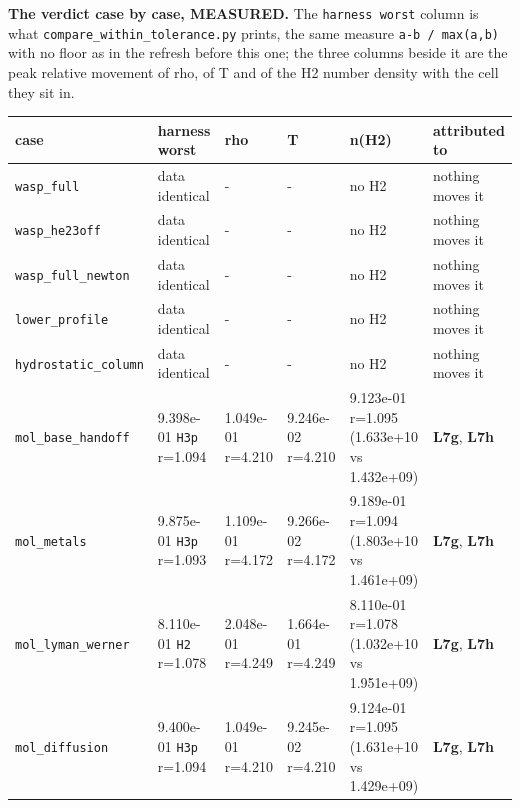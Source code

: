 \documentclass[english,a4paper]{my_memo}
\begin{document}
\textbf{The verdict case by case, MEASURED.} The \texttt{harness\ worst} column is what
\texttt{compare\_within\_tolerance.py} prints, the same measure \texttt{\textbar{}a-b\textbar{}\ /\ max(\textbar{}a\textbar{},\textbar{}b\textbar{})}
with no floor as in the refresh before this one; the three columns beside it
are the peak relative movement of rho, of T and of the H2 number density with
the cell they sit in.

{\def\LTcaptype{none} %
{\small
\begin{longtable}[]{@{}>{\raggedright\arraybackslash}p{\dimexpr(\linewidth-12\tabcolsep)/6\relax}>{\raggedright\arraybackslash}p{\dimexpr(\linewidth-12\tabcolsep)/6\relax}>{\raggedright\arraybackslash}p{\dimexpr(\linewidth-12\tabcolsep)/6\relax}>{\raggedright\arraybackslash}p{\dimexpr(\linewidth-12\tabcolsep)/6\relax}>{\raggedright\arraybackslash}p{\dimexpr(\linewidth-12\tabcolsep)/6\relax}>{\raggedright\arraybackslash}p{\dimexpr(\linewidth-12\tabcolsep)/6\relax}@{}}
\toprule\noalign{}
case & harness worst & rho & T & n(H2) & attributed to \\
\midrule\noalign{}
\endhead
\bottomrule\noalign{}
\endlastfoot
\texttt{wasp\_full} & data identical & - & - & no H2 & nothing moves it \\
\texttt{wasp\_he23off} & data identical & - & - & no H2 & nothing moves it \\
\texttt{wasp\_full\_newton} & data identical & - & - & no H2 & nothing moves it \\
\texttt{lower\_profile} & data identical & - & - & no H2 & nothing moves it \\
\texttt{hydrostatic\_column} & data identical & - & - & no H2 & nothing moves it \\
\texttt{mol\_base\_handoff} & 9.398e-01 \texttt{H3p} r=1.094 & 1.049e-01 r=4.210 & 9.246e-02 r=4.210 & 9.123e-01 r=1.095 (1.633e+10 vs 1.432e+09) & \textbf{L7g}, \textbf{L7h} \\
\texttt{mol\_metals} & 9.875e-01 \texttt{H3p} r=1.093 & 1.109e-01 r=4.172 & 9.266e-02 r=4.172 & 9.189e-01 r=1.094 (1.803e+10 vs 1.461e+09) & \textbf{L7g}, \textbf{L7h} \\
\texttt{mol\_lyman\_werner} & 8.110e-01 \texttt{H2} r=1.078 & 2.048e-01 r=4.249 & 1.664e-01 r=4.249 & 8.110e-01 r=1.078 (1.032e+10 vs 1.951e+09) & \textbf{L7g}, \textbf{L7h} \\
\texttt{mol\_diffusion} & 9.400e-01 \texttt{H3p} r=1.094 & 1.049e-01 r=4.210 & 9.245e-02 r=4.210 & 9.124e-01 r=1.095 (1.631e+10 vs 1.429e+09) & \textbf{L7g}, \textbf{L7h} \\

\end{longtable}}}
\end{document}
